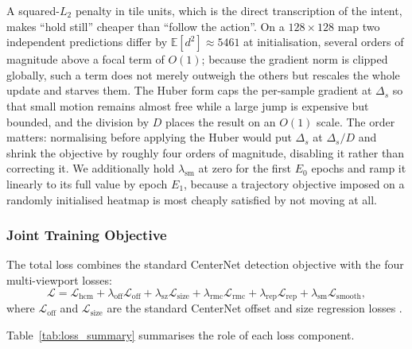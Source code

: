 \documentclass[preprint,12pt]{elsarticle}
\begin{document}
A squared-$L_2$ penalty in tile units, which is the direct transcription of
the intent, makes ``hold still'' cheaper than ``follow the action''. On a
$128 \times 128$ map two independent predictions differ by
$\mathbb{E}[d^2] \approx 5461$ at initialisation, several orders of magnitude
above a focal term of $O(1)$; because the gradient norm is clipped globally,
such a term does not merely outweigh the others but rescales the whole update
and starves them. The Huber form caps the per-sample gradient at $\Delta_s$ so
that small motion remains almost free while a large jump is expensive but
bounded, and the division by $D$ places the result on an $O(1)$ scale. The
order matters: normalising before applying the Huber would put $\Delta_s$ at
$\Delta_s/D$ and shrink the objective by roughly four orders of magnitude,
disabling it rather than correcting it. We additionally hold
$\lambda_{\text{sm}}$ at zero for the first $E_0$ epochs and ramp it linearly
to its full value by epoch $E_1$, because a trajectory objective imposed on a
randomly initialised heatmap is most cheaply satisfied by not moving at all.

\subsubsection{Joint Training Objective}

The total loss combines the standard CenterNet detection objective with the 
four multi-viewport losses:
\begin{equation}
  \mathcal{L} = \mathcal{L}_{\text{hcm}} 
              + \lambda_{\text{off}}\mathcal{L}_{\text{off}} 
              + \lambda_{\text{sz}}\mathcal{L}_{\text{size}} 
              + \lambda_{\text{rmc}}\mathcal{L}_{\text{rmc}}
              + \lambda_{\text{rep}}\mathcal{L}_{\text{rep}}
              + \lambda_{\text{sm}}\mathcal{L}_{\text{smooth}},
  \label{eq:total_loss}
\end{equation}
where $\mathcal{L}_{\text{off}}$ and $\mathcal{L}_{\text{size}}$ are the 
standard CenterNet offset and size regression losses \cite{zhou2019objects}.

Table~\ref{tab:loss_summary} summarises the role of each loss component.
\end{document}
